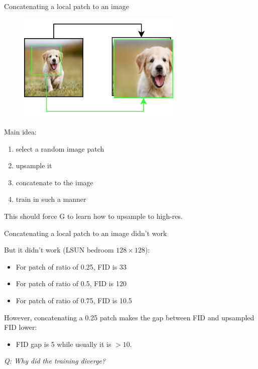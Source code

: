 \documentclass[10pt]{beamer}
\begin{document}
\begin{frame}{Concatenating a local patch to an image}
\begin{figure}
\centering
\includegraphics[width=0.7\textwidth]{images/patch-concatenation}
\end{figure}

Main idea:
\begin{enumerate}
    \item select a random image patch
    \item upsample it
    \item concatenate to the image
    \item train in such a manner
\end{enumerate}

This should force G to learn how to upsample to high-res.
\end{frame}

\begin{frame}{Concatenating a local patch to an image didn't work}
\pause

But it didn't work (LSUN bedroom $128 \times 128$):
\begin{itemize}
    \item For patch of ratio of 0.25, FID is 33
    \item For patch of ratio of 0.5, FID is 120
    \item For patch of ratio of 0.75, FID is 10.5
\end{itemize}

\pause
However, concatenating a 0.25 patch makes the gap between FID and upsampled FID lower:
\begin{itemize}
    \item FID gap is 5 while usually it is $>10$.
\end{itemize}

\pause
\textit{Q: Why did the training diverge?}
\end{frame}
\end{document}
